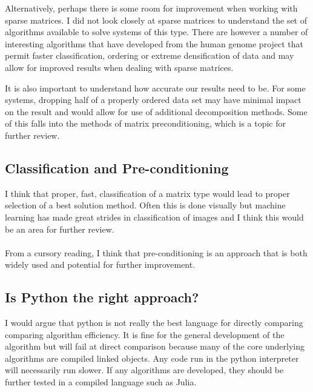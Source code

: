 \documentclass[12pt]{article}
\begin{document}
Alternatively, perhaps there is some room for improvement when working with sparse matrices. I did not look closely at sparse matrices to understand the set of algorithms available to solve systems of this type. There are however a number of interesting algorithms that have developed from the human genome project that permit faster classification, ordering or extreme densification of data and may allow for improved results when dealing with sparse matrices.

It is also important to understand how accurate our results need to be. For some systems, dropping half of a properly ordered data set may have minimal impact on the result and would allow for use of additional decomposition methods. Some of this falls into the methods of matrix preconditioning, which is a topic for further review.

\subsection{Classification and Pre-conditioning}
I think that proper, fast, classification of a matrix type would lead to proper selection of a best solution method. Often this is done visually but machine learning has made great strides in classification of images and I think this would be an area for further review.
\\\\
From a cursory reading, I think that pre-conditioning is an approach that is both widely used and potential for further improvement.

\subsection{Is Python the right approach?}
I would argue that python is not really the best language for directly comparing comparing algorithm efficiency. It is fine for the general development of the algorithm but will fail at direct comparison because many of the core underlying algorithms are compiled linked objects. Any code run in the python interpreter will necessarily run slower. If any algorithms are developed, they should be further tested in a compiled language such as Julia.
\end{document}

